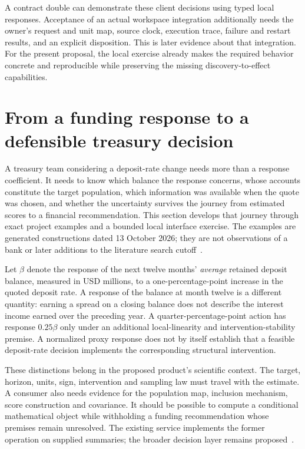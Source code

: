 A contract double can demonstrate these client decisions using typed local
responses. Acceptance of an actual workspace integration additionally needs
the owner's request and unit map, source clock, execution trace, failure and
restart results, and an explicit disposition. This is later evidence about
that integration. For the present proposal, the local exercise already makes
the required behavior concrete and reproducible while preserving the missing
discovery-to-effect capabilities.
\label{exec13:discovery-journey-end}


\section{From a funding response to a defensible treasury decision}
\label{exec13:funding-journey}

A treasury team considering a deposit-rate change needs more than a response
coefficient. It needs to know which balance the response concerns, whose
accounts constitute the target population, which information was available
when the quote was chosen, and whether the uncertainty survives the journey
from estimated scores to a financial recommendation. This section develops
that journey through exact project examples and a bounded local interface
exercise. The examples are generated constructions dated 13 October 2026;
they are not observations of a bank or later additions to the literature
search cutoff~\citep{exec13_funding_exact,exec13_funding_runtime}.

Let $\beta$ denote the response of the next twelve months' \emph{average}
retained deposit balance, measured in USD millions, to a one-percentage-point
increase in the quoted deposit rate. A response of the balance at month twelve
is a different quantity: earning a spread on a closing balance does not
describe the interest income earned over the preceding year. A
quarter-percentage-point action has response $0.25\beta$ only under an
additional local-linearity and intervention-stability premise. A normalized
proxy response does not by itself establish that a feasible deposit-rate
decision implements the corresponding structural intervention.

These distinctions belong in the proposed product's scientific context.
The target, horizon, units, sign, intervention and sampling law must travel
with the estimate. A consumer also needs evidence for the population map,
inclusion mechanism, score construction and covariance. It should be possible
to compute a conditional mathematical object while withholding a funding
recommendation whose premises remain unresolved. The existing service
implements the former operation on supplied summaries; the broader decision
layer remains proposed~\citep{exec13_funding_service}.

